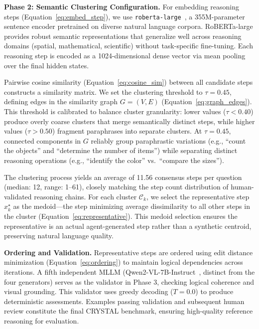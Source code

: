 \textbf{Phase 2: Semantic Clustering Configuration.}
For embedding reasoning steps (Equation~\ref{eq:embed_step}), we use \texttt{roberta-large}~\cite{liu2019roberta}, a 355M-parameter sentence encoder pretrained on diverse natural language corpora. RoBERTa-large provides robust semantic representations that generalize well across reasoning domains (spatial, mathematical, scientific) without task-specific fine-tuning. Each reasoning step is encoded as a 1024-dimensional dense vector via mean pooling over the final hidden states.

Pairwise cosine similarity (Equation~\ref{eq:cosine_sim}) between all candidate steps constructs a similarity matrix. We set the clustering threshold to $\tau = 0.45$, defining edges in the similarity graph $G=(V,E)$ (Equation~\ref{eq:graph_edges}). This threshold is calibrated to balance cluster granularity: lower values ($\tau < 0.40$) produce overly coarse clusters that merge semantically distinct steps, while higher values ($\tau > 0.50$) fragment paraphrases into separate clusters. At $\tau=0.45$, connected components in $G$ reliably group paraphrastic variations (e.g., ``count the objects'' and ``determine the number of items'') while separating distinct reasoning operations (e.g., ``identify the color'' vs.~``compare the sizes'').

The clustering process yields an average of 11.56 consensus steps per question (median: 12, range: 1--61), closely matching the step count distribution of human-validated reasoning chains. For each cluster $\mathcal{C}_k$, we select the representative step $x_k^{\star}$ as the medoid—the step minimizing average dissimilarity to all other steps in the cluster (Equation~\ref{eq:representative}). This medoid selection ensures the representative is an actual agent-generated step rather than a synthetic centroid, preserving natural language quality.

\textbf{Ordering and Validation.}
Representative steps are ordered using edit distance minimization (Equation~\ref{eq:ordering}) to maintain logical dependencies across iterations. A fifth independent MLLM (Qwen2-VL-7B-Instruct~\cite{qwen2vl2024}, distinct from the four generators) serves as the validator in Phase 3, checking logical coherence and visual grounding. This validator uses greedy decoding ($T=0.0$) to produce deterministic assessments. Examples passing validation and subsequent human review constitute the final CRYSTAL benchmark, ensuring high-quality reference reasoning for evaluation.
